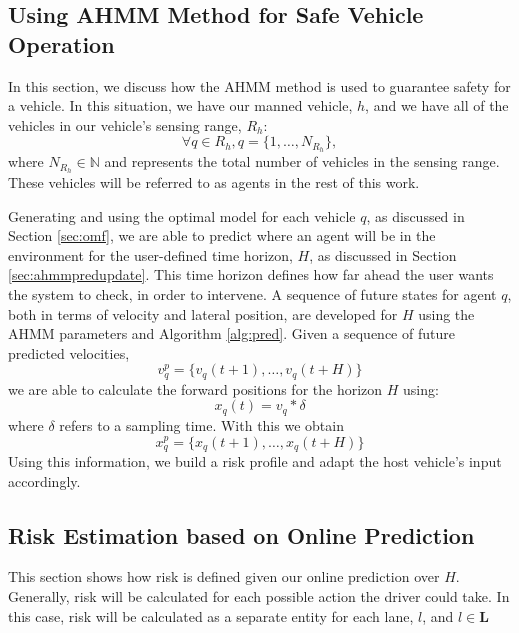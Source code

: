 \documentclass[conference]{IEEEtran}
\begin{document}
\subsection{Using AHMM Method for Safe Vehicle Operation}
In this section, we discuss how the AHMM method is used to guarantee safety for a vehicle. In this situation, we have our manned vehicle, $h$, and we have all of the vehicles in our vehicle's sensing range, $R_h$:
\begin{equation}
    \forall{q}\in R_h, q = \{1,\ldots,N_{R_h}\},
\end{equation}
where $N_{R_h}\in\mathbb{N}$ and represents the total number of vehicles in the sensing range. These vehicles will be referred to as agents in the rest of this work.

Generating and using the optimal model for each vehicle $q$, as discussed in Section \ref{sec:omf}, we are able to predict where an agent will be in the environment for the user-defined time horizon, $H$, as discussed in Section \ref{sec:ahmmpredupdate}. This time horizon defines how far ahead the user wants the system to check, in order to intervene. A sequence of future states for agent $q$, both in terms of velocity and lateral position, are developed for $H$ using the AHMM parameters and Algorithm \ref{alg:pred}. Given a sequence of future predicted velocities,
\begin{equation}
    v_q^p = \{v_q(t+1),\ldots,v_q(t+H)\}
\end{equation}
we are able to calculate the forward positions for the horizon $H$ using:
\begin{equation} \label{eq:dumpos}
    x_q(t) = v_q*\delta
\end{equation}
where $\delta$ refers to a sampling time. With this we obtain
\begin{equation}
    x_q^p = \{x_q(t+1),\ldots,x_q(t+H)\}
\end{equation}
Using this information, we build a risk profile and adapt the host vehicle's input accordingly.


\subsection{Risk Estimation based on Online Prediction}
This section shows how risk is defined given our online prediction over $H$. Generally, risk will be calculated for each possible action the driver could take. In this case, risk will be calculated as a separate entity for each lane, $l$, and $l\in\mathbf{L}$
\end{document}
